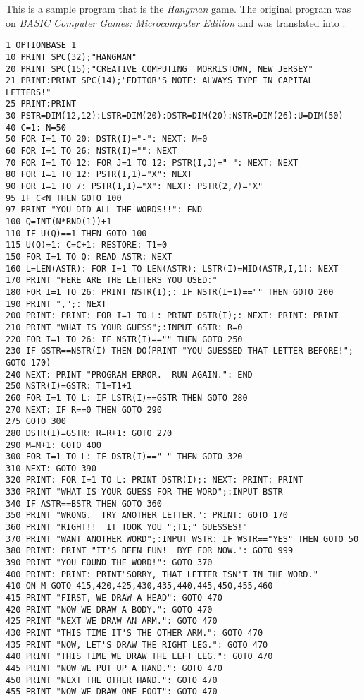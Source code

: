 This is a sample program that is the \emph{Hangman} game. The original program was on \emph{BASIC Computer Games: Microcomputer Edition} and was translated into \tbas.

\begin{lstlisting}
1 OPTIONBASE 1
10 PRINT SPC(32);"HANGMAN"
20 PRINT SPC(15);"CREATIVE COMPUTING  MORRISTOWN, NEW JERSEY"
21 PRINT:PRINT SPC(14);"EDITOR'S NOTE: ALWAYS TYPE IN CAPITAL LETTERS!"
25 PRINT:PRINT
30 PSTR=DIM(12,12):LSTR=DIM(20):DSTR=DIM(20):NSTR=DIM(26):U=DIM(50)
40 C=1: N=50
50 FOR I=1 TO 20: DSTR(I)="-": NEXT: M=0
60 FOR I=1 TO 26: NSTR(I)="": NEXT
70 FOR I=1 TO 12: FOR J=1 TO 12: PSTR(I,J)=" ": NEXT: NEXT
80 FOR I=1 TO 12: PSTR(I,1)="X": NEXT
90 FOR I=1 TO 7: PSTR(1,I)="X": NEXT: PSTR(2,7)="X"
95 IF C<N THEN GOTO 100
97 PRINT "YOU DID ALL THE WORDS!!": END
100 Q=INT(N*RND(1))+1
110 IF U(Q)==1 THEN GOTO 100
115 U(Q)=1: C=C+1: RESTORE: T1=0
150 FOR I=1 TO Q: READ ASTR: NEXT
160 L=LEN(ASTR): FOR I=1 TO LEN(ASTR): LSTR(I)=MID(ASTR,I,1): NEXT
170 PRINT "HERE ARE THE LETTERS YOU USED:"
180 FOR I=1 TO 26: PRINT NSTR(I);: IF NSTR(I+1)=="" THEN GOTO 200
190 PRINT ",";: NEXT
200 PRINT: PRINT: FOR I=1 TO L: PRINT DSTR(I);: NEXT: PRINT: PRINT
210 PRINT "WHAT IS YOUR GUESS";:INPUT GSTR: R=0
220 FOR I=1 TO 26: IF NSTR(I)=="" THEN GOTO 250
230 IF GSTR==NSTR(I) THEN DO(PRINT "YOU GUESSED THAT LETTER BEFORE!"; GOTO 170)
240 NEXT: PRINT "PROGRAM ERROR.  RUN AGAIN.": END
250 NSTR(I)=GSTR: T1=T1+1
260 FOR I=1 TO L: IF LSTR(I)==GSTR THEN GOTO 280
270 NEXT: IF R==0 THEN GOTO 290
275 GOTO 300
280 DSTR(I)=GSTR: R=R+1: GOTO 270
290 M=M+1: GOTO 400
300 FOR I=1 TO L: IF DSTR(I)=="-" THEN GOTO 320
310 NEXT: GOTO 390
320 PRINT: FOR I=1 TO L: PRINT DSTR(I);: NEXT: PRINT: PRINT
330 PRINT "WHAT IS YOUR GUESS FOR THE WORD";:INPUT BSTR
340 IF ASTR==BSTR THEN GOTO 360
350 PRINT "WRONG.  TRY ANOTHER LETTER.": PRINT: GOTO 170
360 PRINT "RIGHT!!  IT TOOK YOU ";T1;" GUESSES!"
370 PRINT "WANT ANOTHER WORD";:INPUT WSTR: IF WSTR=="YES" THEN GOTO 50
380 PRINT: PRINT "IT'S BEEN FUN!  BYE FOR NOW.": GOTO 999
390 PRINT "YOU FOUND THE WORD!": GOTO 370
400 PRINT: PRINT: PRINT"SORRY, THAT LETTER ISN'T IN THE WORD."
410 ON M GOTO 415,420,425,430,435,440,445,450,455,460
415 PRINT "FIRST, WE DRAW A HEAD": GOTO 470
420 PRINT "NOW WE DRAW A BODY.": GOTO 470
425 PRINT "NEXT WE DRAW AN ARM.": GOTO 470
430 PRINT "THIS TIME IT'S THE OTHER ARM.": GOTO 470
435 PRINT "NOW, LET'S DRAW THE RIGHT LEG.": GOTO 470
440 PRINT "THIS TIME WE DRAW THE LEFT LEG.": GOTO 470
445 PRINT "NOW WE PUT UP A HAND.": GOTO 470
450 PRINT "NEXT THE OTHER HAND.": GOTO 470
455 PRINT "NOW WE DRAW ONE FOOT": GOTO 470

\end{lstlisting}
